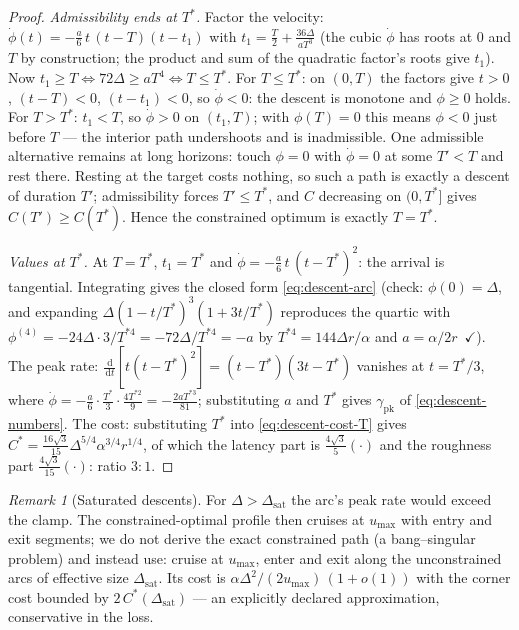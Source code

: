 \documentclass[11pt, a4paper]{article}
\theoremstyle{definition}
\theoremstyle{plain}
\theoremstyle{remark}
\newtheorem{remark}{Remark}[section]
\newcommand{\dd}{\,\mathrm{d}}
\begin{document}
\begin{proof}
\emph{Admissibility ends at $T^*$.}  Factor the velocity:
$\dot\phi(t) = -\tfrac{a}{6}\,t\,(t - T)(t - t_1)$ with
$t_1 = \tfrac{T}{2} + \tfrac{36\Delta}{a T^3}$ (the cubic
$\dot\phi$ has roots at $0$ and $T$ by construction; the product and
sum of the quadratic factor's roots give $t_1$).  Now
$t_1 \ge T \iff 72\Delta \ge aT^4 \iff T \le T^*$.  For
$T \le T^*$: on $(0, T)$ the factors give
$t > 0$, $(t{-}T) < 0$, $(t{-}t_1) < 0$, so $\dot\phi < 0$: the
descent is monotone and $\phi \ge 0$ holds.  For $T > T^*$:
$t_1 < T$, so $\dot\phi > 0$ on $(t_1, T)$; with $\phi(T) = 0$ this
means $\phi < 0$ just before $T$ --- the interior path undershoots
and is inadmissible.  One admissible alternative remains at long
horizons: touch $\phi = 0$ with $\dot\phi = 0$ at some $T' < T$ and
rest there.  Resting at the target costs nothing, so such a path is
exactly a descent of duration $T'$; admissibility forces
$T' \le T^*$, and $C$ decreasing on $(0, T^*]$ gives
$C(T') \ge C(T^*)$.  Hence the constrained optimum is exactly
$T = T^*$.

\emph{Values at $T^*$.}  At $T = T^*$, $t_1 = T^*$ and
$\dot\phi = -\tfrac{a}{6}\,t\,(t - T^*)^2$: the arrival is
tangential.  Integrating gives the closed form
\cref{eq:descent-arc} (check: $\phi(0)=\Delta$, and expanding
$\Delta(1 - t/T^*)^3(1 + 3t/T^*)$ reproduces the quartic with
$\phi^{(4)} = -24\Delta\cdot 3/T^{*4} = -72\Delta/T^{*4} = -a$ by
$T^{*4} = 144\Delta r/\alpha$ and $a = \alpha/2r$~$\checkmark$).
The peak rate: $\tfrac{\dd}{\dd t}[t(t-T^*)^2] = (t-T^*)(3t-T^*)$
vanishes at $t = T^*/3$, where
$\dot\phi = -\tfrac{a}{6}\cdot\tfrac{T^*}{3}\cdot
\tfrac{4T^{*2}}{9} = -\tfrac{2aT^{*3}}{81}$; substituting $a$ and
$T^*$ gives $\gamma_{\mathrm{pk}}$ of \cref{eq:descent-numbers}.
The cost: substituting $T^*$ into \cref{eq:descent-cost-T} gives
$C^* = \tfrac{16\sqrt3}{15}\Delta^{5/4}\alpha^{3/4}r^{1/4}$, of
which the latency part is $\tfrac{4\sqrt3}{5}(\cdot)$ and the
roughness part $\tfrac{4\sqrt3}{15}(\cdot)$: ratio $3{:}1$.
\end{proof}

\begin{remark}[Saturated descents]\label{rem:descent-saturated}
For $\Delta > \Delta_{\mathrm{sat}}$ the arc's peak rate would exceed
the clamp.  The constrained-optimal profile then cruises at
$u_{\max}$ with entry and exit segments; we do not derive the exact
constrained path (a bang--singular problem) and instead use: cruise at
$u_{\max}$, enter and exit along the unconstrained arcs of effective
size $\Delta_{\mathrm{sat}}$.  Its cost is
$\alpha\Delta^2/(2u_{\max})\,(1 + o(1))$ with the corner cost bounded
by $2\,C^*(\Delta_{\mathrm{sat}})$ --- an explicitly declared
approximation, conservative in the loss.
\end{remark}
\end{document}
